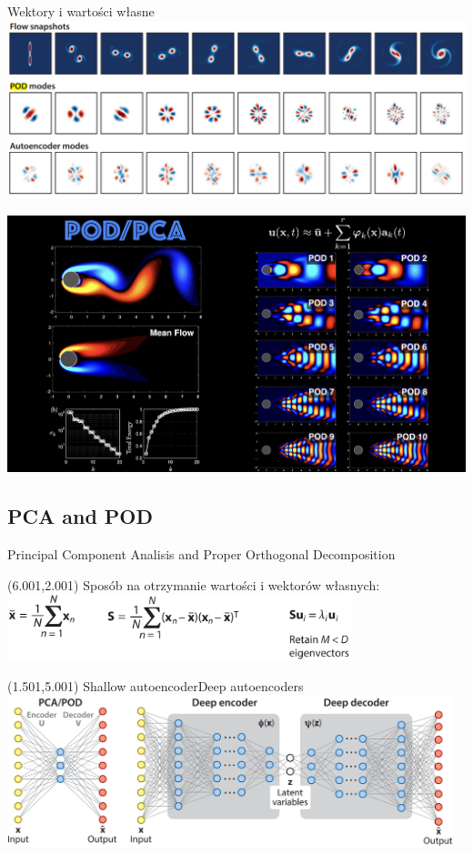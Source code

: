 \documentclass[aspectratio=169]{beamer}
\begin{document}
	\begin{frame}{Wektory i wartości własne}
		\includegraphics[width=14cm]{imgs/pca_pod.png}
	\end{frame}
	
	\begin{frame}
		\includegraphics[width=14cm]{imgs/patterns.jpg}
	\end{frame}

	\subsection{PCA and POD}
	\begin{frame}{Principal Component Analisis and Proper Orthogonal Decomposition}
		\begin{textblock}{13}(6.001,2.001)
			Sposób na otrzymanie wartości i wektorów własnych:
			\includegraphics[width=10cm]{imgs/PCAandPODequation.png}
		\end{textblock}
		\begin{textblock}{13}(1.501,5.001)
			Shallow autoencoder\qquad \qquad \qquad \qquad Deep autoencoders
			\includegraphics[width=13cm]{imgs/PCAandPOD.png}
		\end{textblock}
	\end{frame}
\end{document}
